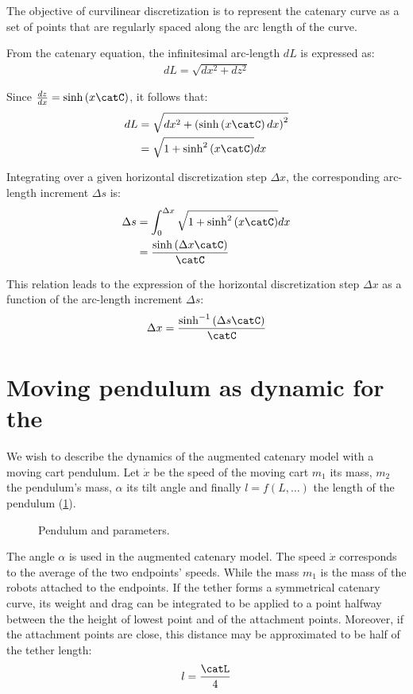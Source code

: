 The objective of curvilinear discretization is to represent the catenary curve as a set of points
that are regularly spaced along the arc length of the curve.

From the catenary equation, the infinitesimal arc-length $dL$ is expressed as:
\begin{align}
	dL = \sqrt{dx^2 + dz^2}
\end{align}

Since $\frac{dz}{dx} = \sinh\left(x\catC\right)$, it follows that:
\begin{align}
	dL & = \sqrt{dx^2 + \left(\sinh\left(x\catC\right) dx\right)^2} \\
	   & = \sqrt{1 + \sinh^2\left(x\catC\right)} dx
\end{align}

Integrating over a given horizontal discretization step $\Delta x$, the corresponding arc-length
increment $\Delta s$ is:
\begin{align}
	\Delta s & = \int_{0}^{\Delta x} \sqrt{1 + \sinh^2\left(x\catC\right)} dx \\
	         & = \frac{\sinh\left(\Delta x \catC\right)}{\catC}
\end{align}

This relation leads to the expression of the horizontal discretization step $\Delta x$ as a
function of the arc-length increment $\Delta s$:
\begin{align}
	\Delta x = \frac{\sinh^{-1}\left(\Delta s \catC\right)}{\catC}
\end{align}

\section{Moving pendulum as dynamic for the \augmentedmodel{}}
\label{mb_moving_pendulum_as_dynamic_for_the_augmented_catenary_model}

We wish to describe the dynamics of the augmented catenary model with a moving cart pendulum. Let
$\dot{x}$ be the speed of the moving cart $m_1$ its mass, $m_2$ the pendulum's mass, $\alpha$ its
tilt angle and finally $l=f(L, \dots)$ the length of the pendulum
(\cref{mb_mpadftacm_schematic}).

\begin{figure}
	\centering
	\caption{Pendulum and parameters.}
	\label{mb_mpadftacm_schematic}
\end{figure}

The angle $\alpha$ is used in the augmented catenary model. The speed $\dot{x}$ corresponds to the
average of the two endpoints' speeds. While the mass $m_1$ is the mass of the robots attached to
the endpoints. If the tether forms a symmetrical catenary curve, its weight and drag can be
integrated to be applied to a point halfway between the the height of lowest point and of the
attachment points. Moreover, if the attachment points are close, this distance may be approximated
to be half of the tether length:
\begin{align}
	l = \frac{\catL}{4}
\end{align}

